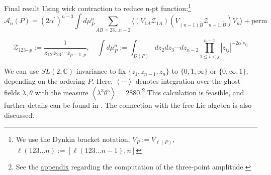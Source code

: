 \documentclass{beamer}
\begin{document}
\begin{frame}{Final result}
	Using wick contraction to reduce n-pt function:\footnote{We use the Dynkin bracket notation, $V_P:=V_{\ell(P)}$, $\ell(123\ldots n):=[\ell(123\ldots n-1),n]$}\cite{Mafra:2011nv}\cite{Mafra:2011nw}
	{\footnotesize
	\begin{equation}\label{eq:n-pt}
		\boxed{\mathcal{A}_n(P)=(2\alpha^{\prime})^{n-3}\int d\mu_P^n\sum_{AB=23\ldots n-2}\langle(V_{1A}\mathcal{Z}_{1A})(V_{(n-1)\tilde{B}}\mathcal{Z}_{n-1,\tilde{B}})V_n\rangle+\mathrm{perm}}
	\end{equation}
	}
	\begin{small}
	\begin{equation*}
		\mathcal{Z}_{123\cdots p}:=\frac{1}{z_{12}z_{23}\cdots z_{p-1,p}},\quad\int d\mu_{P}^{n}:=\int_{D(P)}dz_{2}dz_{3}\cdots dz_{n-2}\prod_{1\leq i<j}^{n-1}\left|z_{ij}\right|^{-2\alpha^{\prime}s_{ij}}
	\end{equation*}
	\end{small}
	We can use $SL(2,\mathbb{C})$ invariance to fix $\{z_1,z_{n-1},z_n\}$ to $\{0,1,\infty\}$ or $\{0,\infty,1\}$, depending on the ordering $P$. Here, $\left\langle\cdots\right\rangle$ denotes integration over the ghost fields ${\lambda,\theta}$ with the measure $\left\langle \lambda^3\theta^5\right\rangle=2880$.\footnote{See the \hyperlink{3-pt}{\color{blue}appendix} regarding the computation of the three-point amplitude.} This calculation is feasible, and further details can be found in \cite{Mafra:2022wml}. The connection with the {\color{WHU} free Lie algebra} is also discussed.
\end{frame}
\end{document}
